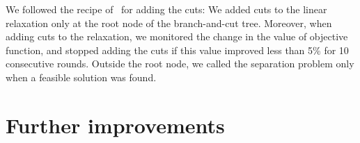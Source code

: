 \documentclass[]{article}
\begin{document}
We followed the recipe of~\citet{carvajal2013} for adding the cuts: We added cuts to the
linear relaxation only at the root node of the branch-and-cut tree.
Moreover, when adding cuts to the relaxation, we monitored the change in
the value of objective function, and stopped adding the cuts if this
value improved less than 5\% for 10 consecutive rounds. Outside the root
node, we called the separation problem only when a feasible solution was
found.

\section{Further improvements}\label{sec:improvement}



\end{document}
